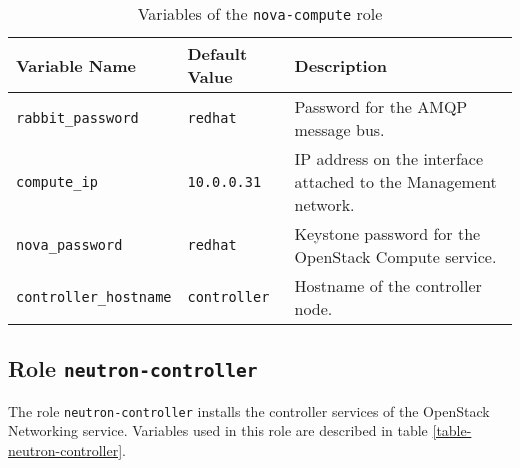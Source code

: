 \begin{table}[!h]
  \centering
  \begin{tabular}{|l|l|p{5cm}|}\hline
    Variable Name & Default Value & Description \\\hline
    \texttt{rabbit\_password} & \texttt{redhat} & Password for the AMQP message bus. \\\hline

    \texttt{compute\_ip} & \texttt{10.0.0.31} & IP address on the interface attached to the Management network. \\\hline
    \texttt{nova\_password} & \texttt{redhat} & Keystone password for the OpenStack Compute service. \\\hline
    \texttt{controller\_hostname} & \texttt{controller} & Hostname of the controller node. \\\hline

  \end{tabular}
\caption{Variables of the \texttt{nova-compute} role}
\label{table-nova-compute}
\end{table}

\clearpage

\subsection{Role \texttt{neutron-controller}}

The role \texttt{neutron-controller} installs the controller services of the OpenStack Networking service. Variables used in this role are described in table \ref{table-neutron-controller}.

